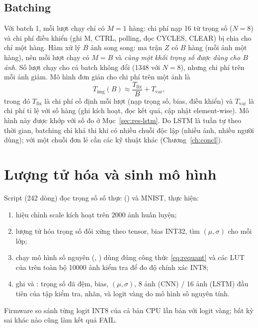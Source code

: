 \subsection{Batching}
\label{sec:batching}
Với batch 1, mỗi lượt chạy chỉ có $M=1$ hàng: chi phí nạp 16 từ trọng số ($N=8$) và chi phí điều khiển (ghi M, CTRL, polling, đọc CYCLES, CLEAR) bị chia cho chỉ một hàng. Hàm  xử lý $B$ ảnh song song: ma trận $Z$ có $B$ hàng (mỗi ảnh một hàng), nên mỗi lượt chạy có $M=B$ và \emph{cùng một khối trọng số được dùng cho $B$ ảnh}. Số lượt chạy cho cả batch không đổi (1348 với $N=8$), nhưng chi phí trên mỗi ảnh giảm. Mô hình đơn giản cho chi phí trên một ảnh là
\begin{equation}
  T_\text{img}(B) \approx \frac{T_\text{fix}}{B} + T_\text{var},
  \label{eq:batchmodel}
\end{equation}
trong đó $T_\text{fix}$ là chi phí cố định mỗi lượt (nạp trọng số, bias, điều khiển) và $T_\text{var}$ là chi phí tỉ lệ với số hàng (ghi kích hoạt, đọc kết quả, cập nhật element-wise). Mô hình này được khớp với số đo ở Mục~\ref{sec:res-lstm}. Do LSTM là tuần tự theo thời gian, batching chỉ khả thi khi có nhiều chuỗi độc lập (nhiều ảnh, nhiều người dùng); với một chuỗi đơn lẻ cần các kỹ thuật khác (Chương~\ref{ch:concl}).

\section{Lượng tử hóa và sinh mô hình}
Script  (242 dòng) đọc trọng số số thực () và MNIST, thực hiện:
\begin{enumerate}
  \item hiệu chỉnh scale kích hoạt trên \num{2000} ảnh huấn luyện;
  \item lượng tử hóa trọng số đối xứng theo tensor, bias INT32, tìm $(\mu,\sigma)$ cho mỗi lớp;
  \item chạy mô hình số nguyên (, ) dùng đúng công thức \eqref{eq:requant} và các LUT của  trên toàn bộ \num{10000} ảnh kiểm tra để đo độ chính xác INT8;
  \item ghi  và : trọng số đã đệm, bias, $(\mu,\sigma)$, 8 ảnh (CNN) / 16 ảnh (LSTM) đầu tiên của tập kiểm tra, nhãn, và logit vàng do mô hình số nguyên tính.
\end{enumerate}
Firmware so sánh từng logit INT8 của cả bản CPU lẫn bản \NPU{} với logit vàng; bất kỳ sai khác nào cũng làm kết quả FAIL.
